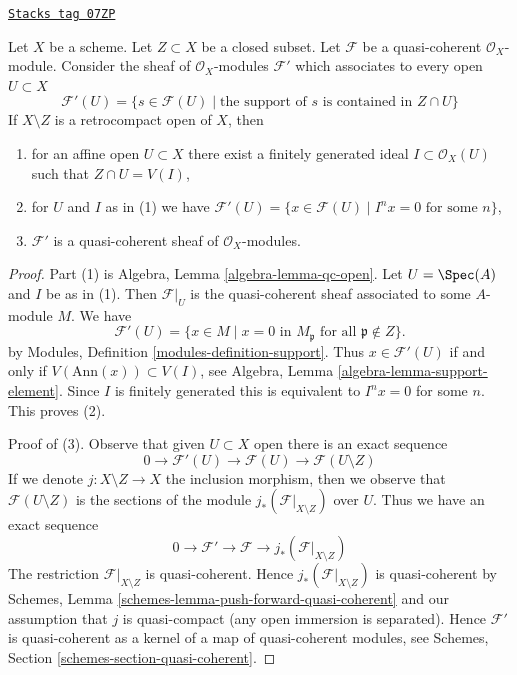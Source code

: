 \begin{lemma}
\label{properties-lemma-sections-supported-on-closed-subset}
\href{https://stacks.math.columbia.edu/tag/07ZP}{\texttt{Stacks tag 07ZP}}

Let $X$ be a scheme. Let $Z \subset X$ be a closed subset.
Let $\mathcal{F}$ be a quasi-coherent $\mathcal{O}_X$-module.
Consider the sheaf of $\mathcal{O}_X$-modules $\mathcal{F}'$
which associates to every open $U \subset X$
$$
\mathcal{F}'(U)
=
\{s \in \mathcal{F}(U) \mid
\text{the support of }s\text{ is contained in }Z \cap U\}
$$
If $X \setminus Z$ is a retrocompact open of $X$, then
\begin{enumerate}
\item for an affine open $U \subset X$ there exist a finitely generated
ideal $I \subset \mathcal{O}_X(U)$ such that $Z \cap U = V(I)$,
\item for $U$ and $I$ as in (1) we have
$\mathcal{F}'(U) = \{x \in \mathcal{F}(U) \mid
I^nx = 0 \text{ for some } n\}$,
\item $\mathcal{F}'$ is a quasi-coherent sheaf of $\mathcal{O}_X$-modules.
\end{enumerate}
\end{lemma}

\begin{proof}
Part (1) is Algebra, Lemma \ref{algebra-lemma-qc-open}.
Let $U = \Spec(A)$ and $I$ be as in (1).
Then $\mathcal{F}|_U$ is the quasi-coherent sheaf associated to
some $A$-module $M$. We have
$$
\mathcal{F}'(U) = \{x \in M \mid x = 0\text{ in }M_\mathfrak p
\text{ for all }\mathfrak p \not \in Z\}.
$$
by Modules, Definition \ref{modules-definition-support}. Thus
$x \in \mathcal{F}'(U)$ if and only if $V(\text{Ann}(x)) \subset V(I)$, see
Algebra, Lemma \ref{algebra-lemma-support-element}. Since $I$ is
finitely generated this is equivalent to $I^n x = 0$ for some $n$.
This proves (2).

\medskip\noindent
Proof of (3). Observe that given $U \subset X$ open there is an exact sequence
$$
0 \to \mathcal{F}'(U) \to \mathcal{F}(U) \to \mathcal{F}(U \setminus Z)
$$
If we denote $j : X \setminus Z \to X$ the inclusion morphism, then
we observe that $\mathcal{F}(U \setminus Z)$ is the sections of the
module $j_*(\mathcal{F}|_{X \setminus Z})$ over $U$. Thus we have
an exact sequence
$$
0 \to \mathcal{F}' \to \mathcal{F} \to j_*(\mathcal{F}|_{X \setminus Z})
$$
The restriction $\mathcal{F}|_{X \setminus Z}$ is quasi-coherent.
Hence $j_*(\mathcal{F}|_{X \setminus Z})$ is quasi-coherent
by Schemes, Lemma \ref{schemes-lemma-push-forward-quasi-coherent}
and our assumption that $j$ is quasi-compact (any open immersion
is separated). Hence $\mathcal{F}'$ is quasi-coherent
as a kernel of a map of quasi-coherent modules, see
Schemes, Section \ref{schemes-section-quasi-coherent}.
\end{proof}

